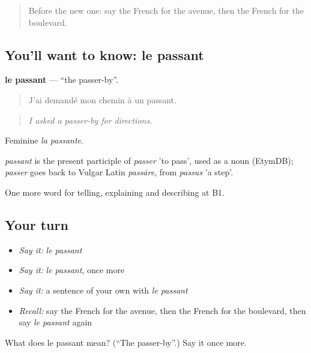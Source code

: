 \label{lesson:FR-C437-passant}



\begin{quote}
Before the new one: say the French for the avenue, then the French for the boulevard.
\end{quote}

\subsection*{You'll want to know: le passant}
\textbf{le passant} — \textquotedblleft{}the passer-by\textquotedblright{}.

\begin{quote}
J'ai demandé mon chemin à un passant.
\end{quote}

\begin{quote}
\emph{I asked a passer-by for directions.}
\end{quote}

Feminine \emph{la passante}.

\begin{cousinweb}
\emph{passant} is the present participle of \emph{passer} 'to pass', used as a noun (EtymDB); \emph{passer} goes back to Vulgar Latin \emph{passāre}, from \emph{passus} 'a step'.
\end{cousinweb}

\begin{grammarlens}[title={What you've built}]
One more word for telling, explaining and describing at B1.
\end{grammarlens}

\subsection*{Your turn}
\begin{itemize}
\raggedright
  \item \emph{Say it:} \emph{le passant}
  \item \emph{Say it:} \emph{le passant}, once more
  \item \emph{Say it:} a sentence of your own with \emph{le passant}
  \item \emph{Recall:} say the French for the avenue, then the French for the boulevard, then say \emph{le passant} again
\end{itemize}

\begin{tcolorbox}[breakable,colback=teal!4,colframe=teal!35!black,title={Before you move on}]
What does le passant mean? (\textquotedblleft{}The passer-by\textquotedblright{}.) Say it once more.
\end{tcolorbox}
